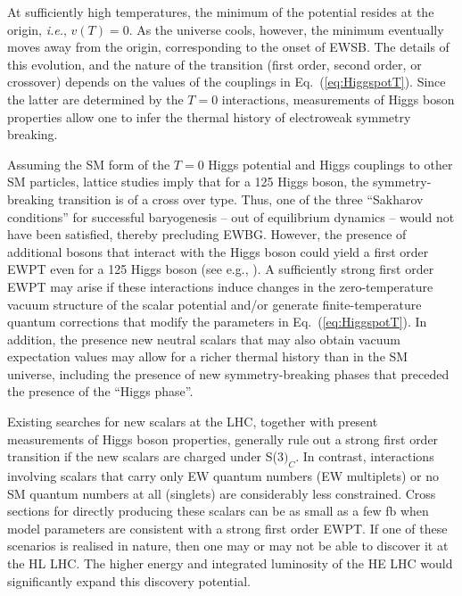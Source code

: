 At sufficiently high temperatures, the minimum of the potential resides at the origin, {\it i.e.}, $v(T) = 0$. As the universe cools, however, the minimum eventually moves away from the origin, corresponding to the onset of EWSB. The details of this evolution, and the nature of the transition (first order, second order, or crossover) depends on the values of the couplings in Eq.~(\ref{eq:HiggspotT}). Since the latter are determined by the $T=0$ interactions, measurements of Higgs boson properties allow one to infer the thermal history of electroweak symmetry breaking. 

Assuming the SM form of the $T=0$ Higgs potential and Higgs couplings to other SM particles, lattice studies imply that for a 125 \UGeV Higgs boson, the symmetry-breaking transition is of a cross over type\cite{Rummukainen:1998as,Csikor:1998eu,Laine:1998jb,Gurtler:1997hr}. Thus, one of the three ``Sakharov conditions'' for successful baryogenesis\cite{Sakharov:1967dj} -- out of equilibrium dynamics -- would not have been satisfied, thereby precluding EWBG. However, the presence of additional bosons that interact with the Higgs boson could yield a first order EWPT even for a 125 \UGeV Higgs boson (see e.g., \cite{Morrissey:2012db,Assamagan:2016azc}). A sufficiently strong first order EWPT may arise if these interactions induce changes in the zero-temperature vacuum structure of the scalar potential and/or generate finite-temperature quantum corrections that modify the parameters in Eq.~(\eqref{eq:HiggspotT}). In addition, the presence new neutral scalars that may also obtain vacuum expectation values may allow for a richer thermal history than in the SM universe, including the presence of new symmetry-breaking phases that preceded the presence of the ``Higgs phase''\cite{Patel:2012pi,Patel:2013zla,Blinov:2015sna,Ramsey-Musolf:2017tgh}. 

 Existing searches for new scalars at the LHC, together with present measurements of Higgs boson properties, generally rule out a strong first order transition if the new scalars are charged under S(3$)_C$\cite{Katz:2014bha,Katz:2015uja}. In contrast, interactions involving scalars that carry only EW quantum numbers (EW multiplets) or no SM quantum numbers at all (singlets) are considerably less constrained. Cross sections for directly producing these scalars can be as small as a few fb when model parameters are consistent with a strong first order EWPT. If one of these scenarios is realised in nature, then one may or may not be able to discover it at the HL LHC. The higher energy and integrated luminosity of the HE LHC would significantly expand this discovery potential. 

